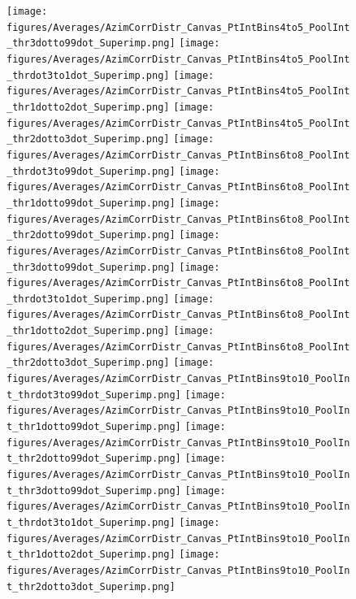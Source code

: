 \begin{figure}
\centering
{\texttt{[image: figures/Averages/AzimCorrDistr\_Canvas\_PtIntBins4to5\_PoolInt\_thr3dotto99dot\_Superimp.png]}}
{\texttt{[image: figures/Averages/AzimCorrDistr\_Canvas\_PtIntBins4to5\_PoolInt\_thrdot3to1dot\_Superimp.png]}}
{\texttt{[image: figures/Averages/AzimCorrDistr\_Canvas\_PtIntBins4to5\_PoolInt\_thr1dotto2dot\_Superimp.png]}}
{\texttt{[image: figures/Averages/AzimCorrDistr\_Canvas\_PtIntBins4to5\_PoolInt\_thr2dotto3dot\_Superimp.png]}}
{\texttt{[image: figures/Averages/AzimCorrDistr\_Canvas\_PtIntBins6to8\_PoolInt\_thrdot3to99dot\_Superimp.png]}}
{\texttt{[image: figures/Averages/AzimCorrDistr\_Canvas\_PtIntBins6to8\_PoolInt\_thr1dotto99dot\_Superimp.png]}}
{\texttt{[image: figures/Averages/AzimCorrDistr\_Canvas\_PtIntBins6to8\_PoolInt\_thr2dotto99dot\_Superimp.png]}}
{\texttt{[image: figures/Averages/AzimCorrDistr\_Canvas\_PtIntBins6to8\_PoolInt\_thr3dotto99dot\_Superimp.png]}}
{\texttt{[image: figures/Averages/AzimCorrDistr\_Canvas\_PtIntBins6to8\_PoolInt\_thrdot3to1dot\_Superimp.png]}}
{\texttt{[image: figures/Averages/AzimCorrDistr\_Canvas\_PtIntBins6to8\_PoolInt\_thr1dotto2dot\_Superimp.png]}}
{\texttt{[image: figures/Averages/AzimCorrDistr\_Canvas\_PtIntBins6to8\_PoolInt\_thr2dotto3dot\_Superimp.png]}}
{\texttt{[image: figures/Averages/AzimCorrDistr\_Canvas\_PtIntBins9to10\_PoolInt\_thrdot3to99dot\_Superimp.png]}}
{\texttt{[image: figures/Averages/AzimCorrDistr\_Canvas\_PtIntBins9to10\_PoolInt\_thr1dotto99dot\_Superimp.png]}}
{\texttt{[image: figures/Averages/AzimCorrDistr\_Canvas\_PtIntBins9to10\_PoolInt\_thr2dotto99dot\_Superimp.png]}}
{\texttt{[image: figures/Averages/AzimCorrDistr\_Canvas\_PtIntBins9to10\_PoolInt\_thr3dotto99dot\_Superimp.png]}}
{\texttt{[image: figures/Averages/AzimCorrDistr\_Canvas\_PtIntBins9to10\_PoolInt\_thrdot3to1dot\_Superimp.png]}}
{\texttt{[image: figures/Averages/AzimCorrDistr\_Canvas\_PtIntBins9to10\_PoolInt\_thr1dotto2dot\_Superimp.png]}}
{\texttt{[image: figures/Averages/AzimCorrDistr\_Canvas\_PtIntBins9to10\_PoolInt\_thr2dotto3dot\_Superimp.png]}}
\end{figure}
